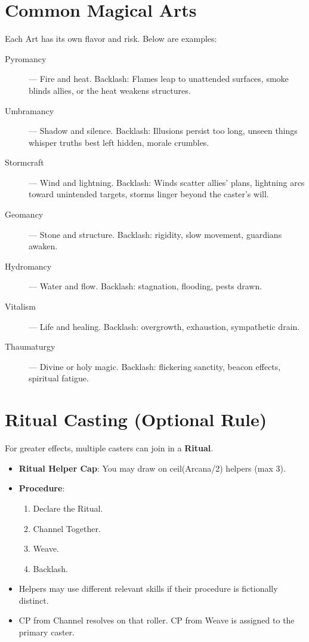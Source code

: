 \section{Common Magical Arts}

Each Art has its own flavor and risk. Below are examples:

\begin{description}
  \item[Pyromancy] — Fire and heat. Backlash: Flames leap to unattended surfaces, smoke blinds allies, or the heat weakens structures.
  \item[Umbramancy] — Shadow and silence. Backlash: Illusions persist too long, unseen things whisper truths best left hidden, morale crumbles.
  \item[Stormcraft] — Wind and lightning. Backlash: Winds scatter allies' plans, lightning arcs toward unintended targets, storms linger beyond the caster's will.
  \item[Geomancy] — Stone and structure. Backlash: rigidity, slow movement, guardians awaken.
  \item[Hydromancy] — Water and flow. Backlash: stagnation, flooding, pests drawn.
  \item[Vitalism] — Life and healing. Backlash: overgrowth, exhaustion, sympathetic drain.
  \item[Thaumaturgy] — Divine or holy magic. Backlash: flickering sanctity, beacon effects, spiritual fatigue.
\end{description}

\section{Ritual Casting (Optional Rule)}

For greater effects, multiple casters can join in a \textbf{Ritual}.

\begin{itemize}
  \item \textbf{Ritual Helper Cap}: You may draw on ceil(Arcana/2) helpers (max 3).
  \item \textbf{Procedure}:
  \begin{enumerate}
    \item Declare the Ritual.
    \item Channel Together.
    \item Weave.
    \item Backlash.
  \end{enumerate}
  \item Helpers may use different relevant skills if their procedure is fictionally distinct.
  \item CP from Channel resolves on that roller. CP from Weave is assigned to the primary caster.
\end{itemize}

